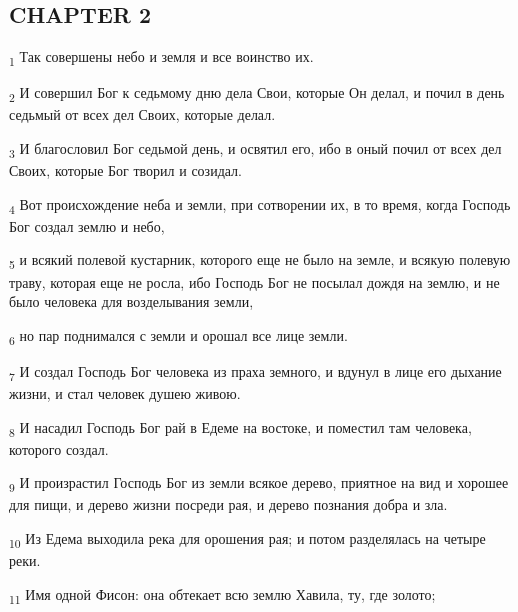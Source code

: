 \subsection{CHAPTER 2}
\begin{tcolorbox}
\textsubscript{1} Так совершены небо и земля и все воинство их.
\end{tcolorbox}
\begin{tcolorbox}
\textsubscript{2} И совершил Бог к седьмому дню дела Свои, которые Он делал, и почил в день седьмый от всех дел Своих, которые делал.
\end{tcolorbox}
\begin{tcolorbox}
\textsubscript{3} И благословил Бог седьмой день, и освятил его, ибо в оный почил от всех дел Своих, которые Бог творил и созидал.
\end{tcolorbox}
\begin{tcolorbox}
\textsubscript{4} Вот происхождение неба и земли, при сотворении их, в то время, когда Господь Бог создал землю и небо,
\end{tcolorbox}
\begin{tcolorbox}
\textsubscript{5} и всякий полевой кустарник, которого еще не было на земле, и всякую полевую траву, которая еще не росла, ибо Господь Бог не посылал дождя на землю, и не было человека для возделывания земли,
\end{tcolorbox}
\begin{tcolorbox}
\textsubscript{6} но пар поднимался с земли и орошал все лице земли.
\end{tcolorbox}
\begin{tcolorbox}
\textsubscript{7} И создал Господь Бог человека из праха земного, и вдунул в лице его дыхание жизни, и стал человек душею живою.
\end{tcolorbox}
\begin{tcolorbox}
\textsubscript{8} И насадил Господь Бог рай в Едеме на востоке, и поместил там человека, которого создал.
\end{tcolorbox}
\begin{tcolorbox}
\textsubscript{9} И произрастил Господь Бог из земли всякое дерево, приятное на вид и хорошее для пищи, и дерево жизни посреди рая, и дерево познания добра и зла.
\end{tcolorbox}
\begin{tcolorbox}
\textsubscript{10} Из Едема выходила река для орошения рая; и потом разделялась на четыре реки.
\end{tcolorbox}
\begin{tcolorbox}
\textsubscript{11} Имя одной Фисон: она обтекает всю землю Хавила, ту, где золото;
\end{tcolorbox}
